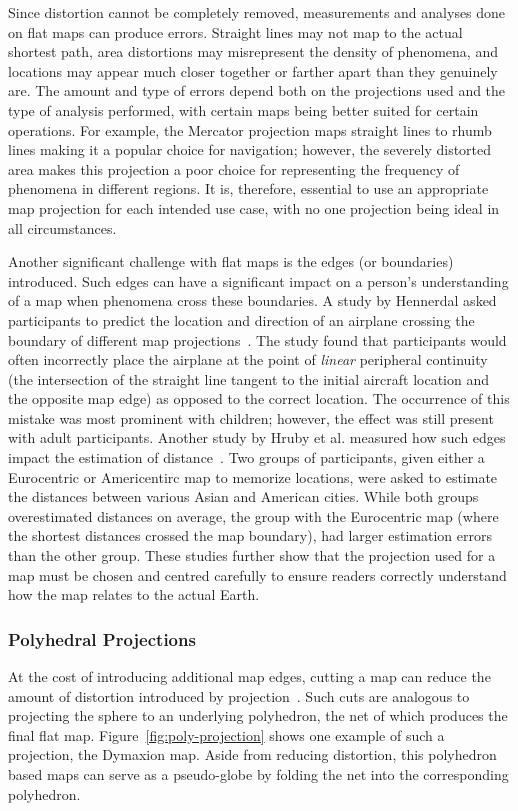 Since distortion cannot be completely removed, measurements and analyses done on flat maps can produce errors.
Straight lines may not map to the actual shortest path, area distortions may misrepresent the density of phenomena, and locations may appear much closer together or farther apart than they genuinely are.
The amount and type of errors depend both on the projections used and the type of analysis performed, with certain maps being better suited for certain operations.
For example, the Mercator projection maps straight lines to rhumb lines making it a popular choice for navigation; however, the severely distorted area makes this projection a poor choice for representing the frequency of phenomena in different regions.
It is, therefore, essential to use an appropriate map projection for each intended use case, with no one projection being ideal in all circumstances.


Another significant challenge with flat maps is the edges (or boundaries) introduced.
Such edges can have a significant impact on a person's understanding of a map when phenomena cross these boundaries.
A study by Hennerdal asked participants to predict the location and direction of an airplane crossing the boundary of different map projections~\cite{hennerdal2015beyond}.
The study found that participants would often incorrectly place the airplane at the point of \textit{linear} peripheral continuity (the intersection of the straight line tangent to the initial aircraft location and the opposite map edge) as opposed to the correct location.
The occurrence of this mistake was most prominent with children; however, the effect was still present with adult participants. Another study by Hruby et al. measured how such edges impact the estimation of distance~\cite{hruby2016journey}.
Two groups of participants, given either a Eurocentric or Americentirc map to memorize locations, were asked to estimate the distances between various Asian and American cities.
While both groups overestimated distances on average, the group with the Eurocentric map (where the shortest distances crossed the map boundary), had larger estimation errors than the other group.
These studies further show that the projection used for a map must be chosen and centred carefully to ensure readers correctly understand how the map relates to the actual Earth.


\subsubsection{Polyhedral Projections} \label{chap:2:polyproj}
At the cost of introducing additional map edges, cutting a map can reduce the amount of distortion introduced by projection~\cite{soliman2018optimal}.
Such cuts are analogous to projecting the sphere to an underlying polyhedron, the net of which produces the final flat map.
Figure~\ref{fig:poly-projection} shows one example of such a projection, the Dymaxion map.
Aside from reducing distortion, this polyhedron based maps can serve as a pseudo-globe by folding the net into the corresponding polyhedron.


